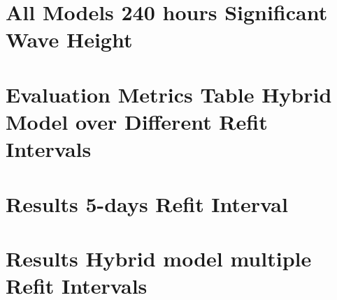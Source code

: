 \documentclass[whitelogo]{TUD-report2020}
\begin{document}
\chapter{All Models 240 hours Significant Wave Height}

\chapter{Evaluation Metrics Table Hybrid Model over Different Refit Intervals}

%
\chapter{Results 5-days Refit Interval}

\chapter{Results Hybrid model multiple Refit Intervals}


\printbibliography
\end{document}
